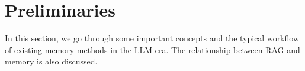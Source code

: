 


\section{Preliminaries}
\label{sec:pre}

  




In this section, we go through some important concepts and the typical workflow of existing memory methods in the LLM era. The relationship between RAG and memory is also discussed. 
  

